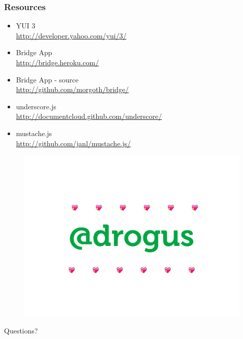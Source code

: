 \documentclass[16pt]{beamer}
\begin{document}
\begin{frame}
  \frametitle{Resources}
  \begin{itemize}
  \item YUI 3\\\url{http://developer.yahoo.com/yui/3/}
  \item Bridge App\\\url{http://bridge.heroku.com/}
  \item Bridge App - source\\\url{http://github.com/morgoth/bridge/}
  \item underscore.js\\\url{http://documentcloud.github.com/underscore/}
  \item mustache.js\\\url{http://github.com/janl/mustache.js/}
  \end{itemize}
\end{frame}

\begin{frame}
  \begin{figure}
    \includegraphics[width=\linewidth]{drogus.png}
  \end{figure}
\end{frame}

\begin{frame}
  \begin{center}
    \Huge{Questions?}
  \end{center}
\end{frame}
\end{document}
